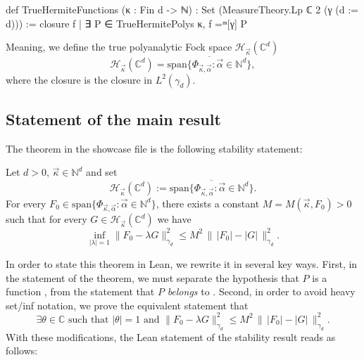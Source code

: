 \documentclass[11pt]{amsart}
\theoremstyle{remark}
\newcommand{\C}{\mathbb{C}}
\newcommand{\N}{\mathbb{N}}
\begin{document}
\begin{leancode}
def TrueHermiteFunctions (κ : Fin d -> ℕ) :
    Set (MeasureTheory.Lp ℂ 2 (γ (d := d))) :=
  closure { f | ∃ P ∈ TrueHermitePolys κ, f =ᵐ[γ] P }
\end{leancode}
Meaning, we define the true polyanalytic Fock space $\mathcal{H}_{\vec\kappa}(\C^d)$
\begin{equation}
    \mathcal{H}_{\vec\kappa}(\C^d) = \overline{\mathrm{span}\{\Phi_{\vec\kappa,\vec\alpha}:\vec\alpha\in\N^d\}},
\end{equation}
where the closure is the closure in $L^2(\gamma_d)$. 
\subsection{Statement of the main result}
The theorem in the showcase file is the following
stability statement:
\begin{theorem*}
Let $d > 0$, $\vec\kappa\in\N^d$ and set
\[
    \mathcal H_{\vec\kappa}(\C^d)
    :=
    \overline{\mathrm{span}\{\Phi_{\vec\kappa,\vec\alpha}:\vec\alpha\in\N^d\}}.
\]
For every $F_0\in \mathrm{span}\{\Phi_{\vec\kappa,\vec\alpha}:\vec\alpha\in\N^d\}$, there exists a
constant $M=M(\vec\kappa,F_0)>0$ such that for every
$G\in\mathcal H_{\vec\kappa}(\C^d)$ we have
\[
\inf_{|\lambda|=1}\lVert F_0-\lambda G\rVert_{\gamma_d}^2
\le
M^2\,\bigl\|\, \lvert F_0\rvert-\lvert G\rvert\,\bigr\|_{\gamma_d}^2.
\]
\end{theorem*}

In order to state this theorem in Lean, we rewrite it in several key ways. First, in the statement of the theorem, we must separate the hypothesis that $P$ is a function , from the statement that $P$ \emph{belongs} to . Second, in order to avoid heavy set/inf notation, we prove the equivalent statement that 
\[
\exists \theta \in \mathbb C\text{ such that } |\theta|=1 \text{ and } \lVert F_0-\lambda G\rVert_{\gamma_d}^2
\le
M^2\,\bigl\|\, \lvert F_0\rvert-\lvert G\rvert\,\bigr\|_{\gamma_d}^2.
\]
With these modifications, the Lean statement of the stability result reads as follows:
\end{document}
